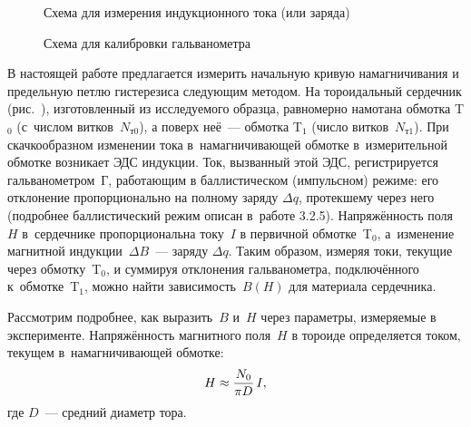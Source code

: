 
\begin{figure}[h!]
\hfil
\parbox{5cm}{%
	\begin{minipage}{5cm}
		\caption{Схема для измерения индукционного тока (или заряда)}
	\end{minipage}%
}\hfil
\parbox{5cm}{%
	\begin{minipage}{5cm}
		\caption{Схема для калибровки гальванометра}
	\end{minipage}
}
\end{figure}

В настоящей работе предлагается измерить начальную кривую намагничивания
и предельную петлю гистерезиса следующим методом.
На тороидальный сердечник (рис.~), изготовленный из исследуемого образца,
равномерно намотана  обмотка T$_0$
(с~числом витков~$N_{т0}$), а поверх неё~---  обмотка
T$_1$
(число витков~$N_{т1}$).
При скачкообразном изменении тока в~намагничивающей обмотке
в~измерительной обмотке возникает ЭДС индукции. Ток, вызванный
этой ЭДС, регистрируется гальванометром~Г, работающим в баллистическом
(импульсном) режиме: его отклонение пропорционально на полному
заряду $\Delta q$, протекшему через него (подробнее баллистический режим
описан в~работе 3.2.5).
Напряжённость поля $H$ в~сердечнике пропорциональна току~$I$ в первичной
обмотке~T$_0$, а~изменение магнитной индукции~$\Delta B$~---
заряду $\Delta q$. Таким образом, измеряя токи,
текущие через обмотку~T$_0$, и суммируя отклонения гальванометра,
подключённого к~обмотке~T$_1$, можно найти
зависимость~$B(H)$ для материала сердечника.

Рассмотрим подробнее, как выразить~$B$ и~$H$ через параметры, измеряемые в
эксперименте. Напряжённость магнитного поля~$H$ в тороиде определяется током,
текущем в~намагничивающей обмотке:
\begin{equation}
	\eqmark{2}
	H\approx\frac{N_{0}}{\pi D}\,I,
\end{equation}
где $D$~--- средний диаметр тора.


